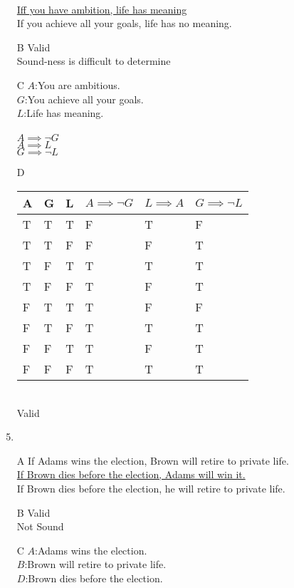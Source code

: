 \documentclass{article}
\begin{document}
\begin{enumerate}
			\\\underline{Iff you have ambition, life has meaning}
			\\If you achieve all your goals, life has no meaning.
		\item[B]
			Valid
			\\Sound-ness is difficult to determine
		\item[C]
			$A$:You are ambitious.\\
			$G$:You achieve all your goals.\\
			$L$:Life has meaning.\\
			\\
			$A \implies \lnot G$\\
			\underline{$A \implies L$}\\
			$G \implies \lnot L$
		\item[D]
			\begin{tabular}{l | l | l || l | l || l}
				A & G & L & $A \implies \lnot G$ & $L \implies A$ & $G \implies \lnot L$\\ \hline
				T & T & T & F & T & F\\
				T & T & F & F & F & T\\
				T & F & T & T & T & T\\
				T & F & F & T & F & T\\
				F & T & T & T & F & F\\
				F & T & F & T & T & T\\
				F & F & T & T & F & T\\
				F & F & F & T & T & T\\
			\end{tabular}
			\\
			Valid
			\\
		\item
		\item[A]
			If Adams wins the election, Brown will retire to private life.
			\\\underline{If Brown dies before the election, Adams will win it.}
			\\If Brown dies before the election, he will retire to private life.
		\item[B]
			Valid
			\\Not Sound
		\item[C]
			$A$:Adams wins the election.\\
			$B$:Brown will retire to private life.\\
			$D$:Brown dies before the election.\\
			\\

\end{enumerate}
\end{document}
